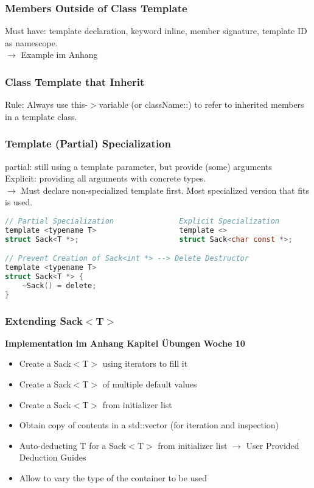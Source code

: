 \subsubsection{Members Outside of Class Template}
Must have: template declaration, keyword inline, member signature, template ID as namescope.\\
$\rightarrow$ Example im Anhang

\subsubsection{Class Template that Inherit}
Rule: Always use this-$>$variable (or className::) to refer to inherited members in a template class.

\subsubsection{Template (Partial) Specialization}
partial: still using a template parameter, but provide (some) arguments\\
Explicit: providing all arguments with concrete types.\\
$\rightarrow$ Must declare non-specialized template first. Most specialized version that fits is used.
\begin{lstlisting}[style=frame, style= linenumbers, language=C]
// Partial Specialization               Explicit Specialization
template <typename T>                   template <>
struct Sack<T *>;                       struct Sack<char const *>;

// Prevent Creation of Sack<int *> --> Delete Destructor
template <typename T>
struct Sack<T *> {
    ~Sack() = delete;
}
\end{lstlisting}

\subsubsection{Extending Sack$<$T$>$}
\textbf{Implementation im Anhang Kapitel Übungen Woche 10}\\
\begin{itemize}
    \item Create a Sack$<$T$>$ using iterators to fill it
    \item Create a Sack$<$T$>$ of multiple default values
    \item Create a Sack$<$T$>$ from initializer list
    \item Obtain copy of contents in a std::vector (for iteration and inspection)
    \item Auto-deducting T for a Sack$<$T$>$ from initializer list $\rightarrow$ User Provided Deduction Guides
    \item Allow to vary the type of the container to be used
\end{itemize}